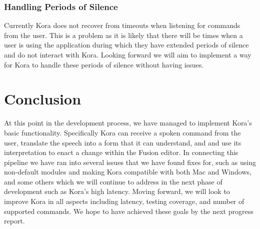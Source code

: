 \documentclass[onecolumn, draftclsnofoot,10pt, compsoc]{IEEEtran}
\begin{document}
    	\subsubsection{Handling Periods of Silence}	
		    Currently Kora does not recover from timeouts when listening for commands from the user.
		    This is a problem as it is likely that there will be times when a user is using the application during which they have extended periods of silence and do not interact with Kora.
		    Looking forward we will aim to implement a way for Kora to handle these periods of silence without having issues.


\section{Conclusion}
	At this point in the development process, we have managed to implement Kora's basic functionality.
	Specifically Kora can receive a spoken command from the user, translate the speech into a form that it can understand, and and use its interpretation to enact a change within the Fusion editor.
	In connecting this pipeline we have ran into several issues that we have found fixes for, such as using non-default modules and making Kora compatible with both Mac and Windows, and some others which we will continue to address in the next phase of development such as Kora's high latency.
	Moving forward, we will look to improve Kora in all aspects including latency, testing coverage, and number of supported commands.
	We hope to have achieved these goals by the next progress report.
\end{document}
